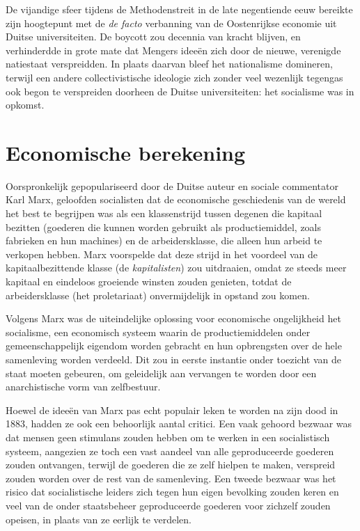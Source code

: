 \documentclass[smalldemyvopaper,11pt,twoside,onecolumn,openright,extrafontsizes,hidelinks]{memoir}
\begin{document}
De vijandige sfeer tijdens de Methodenstreit in de late negentiende eeuw
bereikte zijn hoogtepunt met de \emph{de facto} verbanning van de
Oostenrijkse economie uit Duitse universiteiten. De boycott zou decennia
van kracht blijven, en verhinderdde in grote mate dat Mengers ideeën
zich door de nieuwe, verenigde natiestaat verspreidden. In plaats
daarvan bleef het nationalisme domineren, terwijl een andere
collectivistische ideologie zich zonder veel wezenlijk tegengas ook
begon te verspreiden doorheen de Duitse universiteiten: het socialisme
was in opkomst.

\section{Economische berekening}\label{economische-berekening}

Oorspronkelijk gepopulariseerd door de Duitse auteur en sociale
commentator Karl Marx, geloofden socialisten dat de economische
geschiedenis van de wereld het best te begrijpen was als een
klassenstrijd tussen degenen die kapitaal bezitten (goederen die kunnen
worden gebruikt als productiemiddel, zoals fabrieken en hun machines) en
de arbeidersklasse, die alleen hun arbeid te verkopen hebben. Marx
voorspelde dat deze strijd in het voordeel van de kapitaalbezittende
klasse (de \emph{kapitalisten}) zou uitdraaien, omdat ze steeds meer
kapitaal en eindeloos groeiende winsten zouden genieten, totdat de
arbeidersklasse (het proletariaat) onvermijdelijk in opstand zou komen.

Volgens Marx was de uiteindelijke oplossing voor economische
ongelijkheid het socialisme, een economisch systeem waarin de
productiemiddelen onder gemeenschappelijk eigendom worden gebracht en
hun opbrengsten over de hele samenleving worden verdeeld. Dit zou in
eerste instantie onder toezicht van de staat moeten gebeuren, om
geleidelijk aan vervangen te worden door een anarchistische vorm van
zelfbestuur.

Hoewel de ideeën van Marx pas echt populair leken te worden na zijn dood
in 1883, hadden ze ook een behoorlijk aantal critici. Een vaak gehoord
bezwaar was dat mensen geen stimulans zouden hebben om te werken in een
socialistisch systeem, aangezien ze toch een vast aandeel van alle
geproduceerde goederen zouden ontvangen, terwijl de goederen die ze zelf
hielpen te maken, verspreid zouden worden over de rest van de
samenleving. Een tweede bezwaar was het risico dat socialistische
leiders zich tegen hun eigen bevolking zouden keren en veel van de onder
staatsbeheer geproduceerde goederen voor zichzelf zouden opeisen, in
plaats van ze eerlijk te verdelen.
\end{document}
